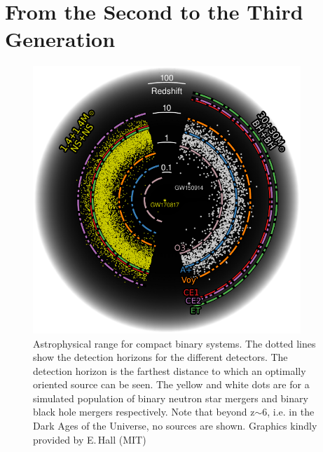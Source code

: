 \documentclass[graybox, nosecnum]{svmult}
\begin{document}
\section{From the Second to the Third Generation}

\begin{figure}[!ht]
    \centering
    \includegraphics[width=0.9\textwidth]{Figures/horizon_donut_nsns_bhbh_o3_aplus_voy_ce1_ce2_et_redshift.pdf}
    \caption{
Astrophysical range for compact binary systems. The dotted lines show the detection horizons for the different detectors. The detection horizon is the farthest distance to which an optimally oriented source can be seen.
The yellow and white dots are for a simulated population of binary neutron star mergers and binary black hole mergers respectively. Note that beyond z$\sim$6, i.e. in the Dark Ages of the Universe, no sources are shown.
\hspace{\textwidth}
Graphics kindly provided by E.\,Hall (MIT)}
\label{fig:2G-3G_range}
\end{figure}
\end{document}
